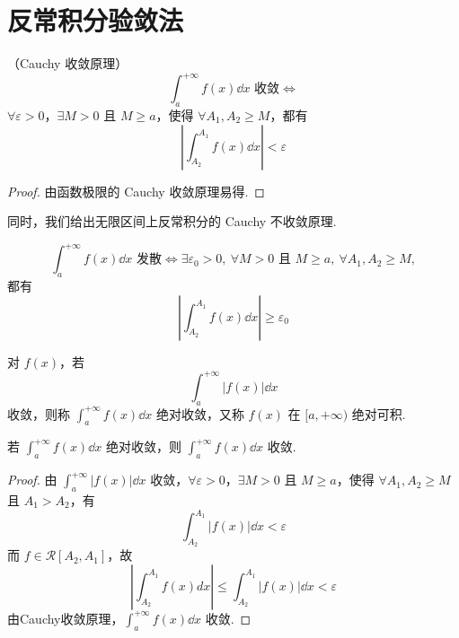 \section{反常积分验敛法}
\begin{proposition}（Cauchy 收敛原理）
	\[
	\int_a^{+\infty} f(x)\dd x \text{ 收敛} \iff
	\]
	$\forall \varepsilon>0$，$\exists M>0$ 且 $M \ge a$，使得 $\forall A_1,A_2 \ge M$，都有
	\[
	\left| \int_{A_2}^{A_1} f(x)\dd x \right| < \varepsilon
	\]
\end{proposition}
\begin{proof}
	由函数极限的 Cauchy 收敛原理易得.
\end{proof}
同时，我们给出无限区间上反常积分的 Cauchy 不收敛原理.

\begin{proposition}
	\[
	\int_a^{+\infty} f(x)\dd x \text{ 发散} \iff \exists \varepsilon_0>0,\ \forall M>0 \text{ 且 } M \ge a,\ \forall A_1,A_2 \ge M,
	\]
	都有
	\[
	\left| \int_{A_2}^{A_1} f(x)\dd x \right| \ge \varepsilon_0
	\]
	
\end{proposition}
\begin{definition}
	对 $f(x)$，若
	\[
	\int_a^{+\infty} |f(x)|\dd x
	\]
	收敛，则称 $\displaystyle\int_a^{+\infty} f(x)\dd x$ 绝对收敛，又称 $f(x)$ 在 $[a,+\infty)$ 绝对可积.
	
\end{definition}

\begin{proposition}
	若 $\displaystyle\int_a^{+\infty} f(x)\dd x$ 绝对收敛，则 $\displaystyle\int_a^{+\infty} f(x)\dd x$ 收敛.
\end{proposition}
\begin{proof}
	由 $\displaystyle\int_a^{+\infty} |f(x)|\dd x$ 收敛，$\forall \varepsilon>0$，$\exists M>0$ 且 $M \ge a$，使得 $\forall A_1,A_2 \ge M$ 且 $A_1>A_2$，有
	\[
	\int_{A_2}^{A_1} |f(x)|\dd x < \varepsilon
	\]
	而 $f \in \mathcal{R}[A_2,A_1]$，故
	\[
	\left| \int_{A_2}^{A_1} f(x)dx \right| \le \int_{A_2}^{A_1} |f(x)|\dd x < \varepsilon
	\]
	由Cauchy收敛原理，$\displaystyle\int_a^{+\infty} f(x)\dd x$ 收敛.
\end{proof}

